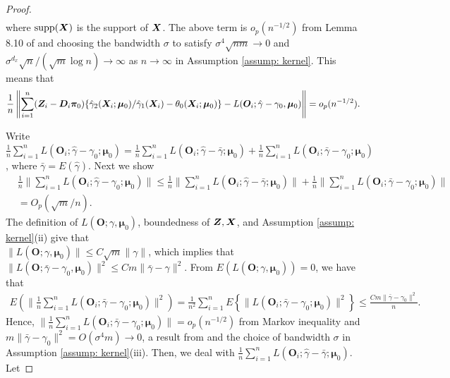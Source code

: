 \documentclass[12pt]{article}
\begin{document}
{\begin{proof}
\begin{align}
\end{align}
where $ \text{supp} (\bm{X}) $ is the support of $ \bm{X} $. The above term is  $ o_p(n^{-1/2}) $ from  Lemma 8.10 of \cite{Newey1994_handbook} and  choosing the bandwidth $ \sigma $ to satisfy $ \sigma^4 \sqrt{nm}\rightarrow0 $ and $ \sigma^{d_x} \sqrt{n}/(\sqrt{m} \log n)\rightarrow\infty $ as $ n\rightarrow\infty $  in Assumption \ref{assump: kernel}. This means that 
\begin{align*}
	\frac1n \left\| \sum_{i=1}^{n} (\bm{Z}_i - \bm D_i \bm \pi_0) \{\hat \gamma_2(\bm{X}_i; \bm \mu_0)/ \hat \gamma_1(\bm{X}_i) - \theta_0(\bm{X}_i; \bm \mu_0)\}-   L(\bm O_i; \hat \gamma- \gamma_0 , \bm \mu_0)  \right\| = o_p(n^{-1/2}). 
\end{align*}

Write $ \frac1n  \sum_{i=1}^{n} L(\bm O_i; \hat\gamma- \gamma_0; \bm\mu_0 )=  \frac1n  \sum_{i=1}^{n} L(\bm O_i; \hat\gamma- \bar \gamma; \bm\mu _0 ) + \frac1n  \sum_{i=1}^{n} L(\bm O_i; \bar\gamma- \gamma_0; \bm\mu_0 )$, where $ \bar \gamma= E(\hat\gamma) $. Next we show
\begin{align*}
	&\frac1n \| \sum_{i=1}^{n} L(\bm O_i; \hat\gamma- \gamma_0; \bm\mu_0 ) \| \leq \frac1n  \|   \sum_{i=1}^{n} L(\bm O_i; \hat\gamma- \bar \gamma; \bm\mu _0 ) \| + \frac1n  \| \sum_{i=1}^{n} L(\bm O_i; \bar\gamma- \gamma_0; \bm\mu_0 ) \|  \\
	&=O_p(\sqrt{m}/n ) .
\end{align*}
 The definition of $ L(\bm O; \gamma, \bm\mu_0) $, boundedness of $ \bm{Z}, \bm{X} $, and Assumption \ref{assump: kernel}(ii) 
  give that \\  $ \|L(\bm O; \gamma, \bm\mu_0)  \|\leq C\sqrt{m} \|\gamma \| $,  which implies that $ \|L(\bm O; \bar \gamma- \gamma_0, \bm\mu_0)  \|^2 \leq C m \|\bar \gamma- \gamma \|^2 $. From $ E( L(\bm O; \gamma, \bm\mu_0))  = 0$,  we  have that 
 \begin{align*}
 	E\left( \|  \frac1n  \sum_{i=1}^{n} L(\bm O_i; \bar\gamma- \gamma_0; \bm\mu_0 ) \|^2  \right) =\frac{1}{n^2}  \sum_{i=1}^{n}  E\left\{ \|   L(\bm O_i; \bar\gamma- \gamma_0; \bm\mu_0 ) \|^2  \right\} \leq \frac{Cm \|\bar\gamma - \gamma_0\|^2}{n}. 
 \end{align*}
Hence, $\|  \frac1n  \sum_{i=1}^{n} L(\bm O_i; \bar\gamma- \gamma_0; \bm\mu_0 ) \|   = o_p(n^{-1/2})$  from Markov inequality and  $m \|\bar\gamma- \gamma_0 \|^2= O(\sigma^4m )\rightarrow 0 $, a result from  \citet[Lemma 8.9]{Newey1994_handbook} and the choice of bandwidth $ \sigma $ in Assumption \ref{assump: kernel}(iii).
Then, we deal with $   \frac1n  \sum_{i=1}^{n} L(\bm O_i; \hat\gamma- \bar \gamma; \bm\mu_0 ) $. Let 

\end{proof}}
\end{document}
